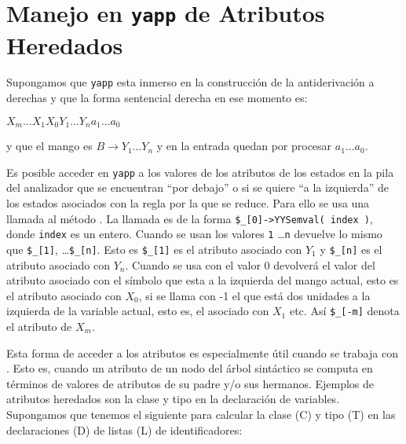 \section{Manejo en {\tt yapp} de Atributos Heredados}
\label{section:heredados}
Supongamos  que \verb|yapp| esta inmerso 
en la construcción de la antiderivación a derechas y que la forma sentencial
derecha en ese momento es:

\begin{center}
$X_m \ldots X_1 X_0 Y_1 \ldots  Y_n a_1 \ldots a_0$
\end{center}

y que el mango es $B \rightarrow Y_1 \ldots  Y_n$ y en la entrada quedan por 
procesar $a_1 \ldots a_0$.

Es posible acceder en \verb|yapp| a los valores de los atributos de los estados en la pila
del analizador que se encuentran ``por debajo'' o si se quiere
``a la izquierda'' de los estados asociados
con la regla por la que se reduce. Para ello se usa una llamada al método
. La llamada es de la forma 
\verb|$_[0]->YYSemval( index )|, donde \verb|index| es un entero.
Cuando se usan los valores \verb|1| \ldots \verb|n| devuelve lo mismo
que \verb|$_[1]|, \ldots \verb|$_[n]|. Esto es 
\verb|$_[1]| es el atributo asociado con $Y_1$ y \verb|$_[n]| es el atributo
asociado con $Y_n$.  Cuando se usa con el valor
0 devolverá el valor del atributo asociado con el símbolo que esta a la izquierda 
del mango actual, esto es el atributo asociado con $X_0$, 
si se llama con -1 el que está dos unidades a la izquierda de la variable actual, 
esto es, el asociado con $X_1$ etc. Así \verb|$_[-m]| denota el atributo
de $X_m$.

Esta forma de acceder a los atributos es especialmente útil cuando se 
trabaja con . Esto es, cuando un atributo
de un nodo del árbol sintáctico se computa en términos
de valores de atributos de su padre y/o sus hermanos.
Ejemplos de atributos heredados son la clase y tipo en la declaración
de variables. Supongamos que tenemos el siguiente 
 para calcular la clase (C) y tipo (T) en 
las declaraciones (D) de listas (L) de identificadores:


